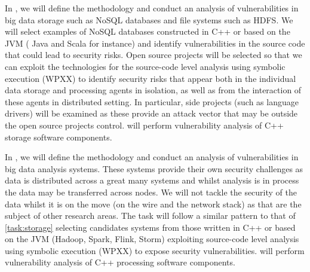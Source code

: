 \begin{Workpackage}{\thewpno}
\begin{Task}
\TaskResults{%
}
\TaskHeader{}
In \theTask, we will define the methodology and conduct an analysis of vulnerabilities in big data storage such as NoSQL databases and file systems such as HDFS.  We will select examples of  NoSQL databases constructed in C++ or  based on the JVM ( Java and Scala for instance) and identify vulnerabilities in the source code that could lead to security risks. Open source projects will be selected so that we can exploit the technologies for the source-code level analysis using symbolic execution (WPXX) to identify security risks that appear both in the individual data storage and processing agents in isolation, as well as from the interaction of these agents in distributed setting. In particular, side projects (such as language drivers) will be examined as these provide an attack vector that may be outside the open source projects control. 
\UCM will perform vulnerability analysis of C++ storage software components.
 \end{Task}

 \begin{Task}
 
 \TaskResults{%
 }
 \TaskHeader{}
 In \theTask, we will define the methodology and conduct an analysis of vulnerabilities in big data analysis systems.  These systems provide their own security challenges as data is distributed across a great many systems and whilst analysis is in process the data may be transferred across nodes.  We will not tackle the security of the data whilst it is on the move (on the wire and the network stack) as that are the subject of other research areas.  The task will follow a similar pattern to that of \ref{task:storage} selecting candidates systems from those written in C++ or based on the JVM (Hadoop, Spark, Flink, Storm) exploiting source-code level analysis using symbolic execution (WPXX) to expose security vulnerabilities.
\UCM will perform vulnerability analysis of C++ processing software components.
\end{Task}
 
\begin{Task}
  

\end{Task}
\end{Workpackage}
